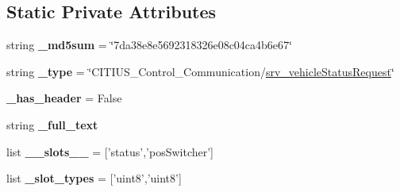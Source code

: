 \subsection*{\-Static \-Private \-Attributes}
\begin{DoxyCompactItemize}
\item 
\hypertarget{class_c_i_t_i_u_s___control___communication_1_1srv_1_1__srv__vehicle_status_1_1srv__vehicle_status_request_a8abd15e9d1600d38079f89309ff9492a}{string {\bfseries \-\_\-md5sum} = \char`\"{}7da38e8e5692318326e08c04ca4b6e67\char`\"{}}\label{class_c_i_t_i_u_s___control___communication_1_1srv_1_1__srv__vehicle_status_1_1srv__vehicle_status_request_a8abd15e9d1600d38079f89309ff9492a}

\item 
\hypertarget{class_c_i_t_i_u_s___control___communication_1_1srv_1_1__srv__vehicle_status_1_1srv__vehicle_status_request_adc0786f317ccdafde3c203edac424836}{string {\bfseries \-\_\-type} = \char`\"{}\-C\-I\-T\-I\-U\-S\-\_\-\-Control\-\_\-\-Communication/\hyperlink{class_c_i_t_i_u_s___control___communication_1_1srv_1_1__srv__vehicle_status_1_1srv__vehicle_status_request}{srv\-\_\-vehicle\-Status\-Request}\char`\"{}}\label{class_c_i_t_i_u_s___control___communication_1_1srv_1_1__srv__vehicle_status_1_1srv__vehicle_status_request_adc0786f317ccdafde3c203edac424836}

\item 
\hypertarget{class_c_i_t_i_u_s___control___communication_1_1srv_1_1__srv__vehicle_status_1_1srv__vehicle_status_request_a85ac2710ac82d8fa525f497867ea1b5a}{{\bfseries \-\_\-has\-\_\-header} = \-False}\label{class_c_i_t_i_u_s___control___communication_1_1srv_1_1__srv__vehicle_status_1_1srv__vehicle_status_request_a85ac2710ac82d8fa525f497867ea1b5a}

\item 
string {\bfseries \-\_\-full\-\_\-text}
\item 
\hypertarget{class_c_i_t_i_u_s___control___communication_1_1srv_1_1__srv__vehicle_status_1_1srv__vehicle_status_request_af0de5e6d7734526c917b4c3e82d8cae1}{list {\bfseries \-\_\-\-\_\-slots\-\_\-\-\_\-} = \mbox{[}'status','pos\-Switcher'\mbox{]}}\label{class_c_i_t_i_u_s___control___communication_1_1srv_1_1__srv__vehicle_status_1_1srv__vehicle_status_request_af0de5e6d7734526c917b4c3e82d8cae1}

\item 
\hypertarget{class_c_i_t_i_u_s___control___communication_1_1srv_1_1__srv__vehicle_status_1_1srv__vehicle_status_request_ae63c2252ad0ccfe1945ff9dde3a08a8a}{list {\bfseries \-\_\-slot\-\_\-types} = \mbox{[}'uint8','uint8'\mbox{]}}\label{class_c_i_t_i_u_s___control___communication_1_1srv_1_1__srv__vehicle_status_1_1srv__vehicle_status_request_ae63c2252ad0ccfe1945ff9dde3a08a8a}

\end{DoxyCompactItemize}


